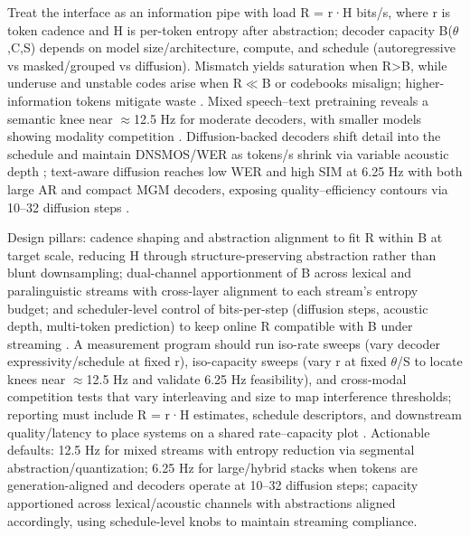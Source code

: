 \documentclass{article}
\begin{document}
Treat the interface as an information pipe with load R = r·H bits/s, where r is token cadence and H is per-token entropy after abstraction; decoder capacity B($\theta$,C,S) depends on model size/architecture, compute, and schedule (autoregressive vs masked/grouped vs diffusion). Mismatch yields saturation when R>B, while underuse and unstable codes arise when R$\ll$B or codebooks misalign; higher-information tokens mitigate waste \cite{huang2024repcodecspeechrepresentationcodectokeniz,chen2023reducingbarriersselfsupervisedlearninghu}. Mixed speech--text pretraining reveals a semantic knee near $\approx$12.5 Hz for moderate decoders, with smaller models showing modality competition \cite{zeng2024scalingspeechtextpretrainingsyntheticint}. Diffusion-backed decoders shift detail into the schedule and maintain DNSMOS/WER as tokens/s shrink via variable acoustic depth \cite{yang2025diffsoundstreamefficientspeechtokenizati}; text-aware diffusion reaches low WER and high SIM at 6.25 Hz with both large AR and compact MGM decoders, exposing quality--efficiency contours via 10--32 diffusion steps \cite{wang2025tadicodectextawarediffusionspeechtokeniz}.

Design pillars: cadence shaping and abstraction alignment to fit R within B at target scale, reducing H through structure-preserving abstraction rather than blunt downsampling; dual-channel apportionment of B across lexical and paralinguistic streams with cross-layer alignment to each stream's entropy budget; and scheduler-level control of bits-per-step (diffusion steps, acoustic depth, multi-token prediction) to keep online R compatible with B under streaming \cite{zeng2024scalingspeechtextpretrainingsyntheticint,yang2025diffsoundstreamefficientspeechtokenizati,wang2025tadicodectextawarediffusionspeechtokeniz}. A measurement program should run iso-rate sweeps (vary decoder expressivity/schedule at fixed r), iso-capacity sweeps (vary r at fixed $\theta$/S to locate knees near $\approx$12.5 Hz and validate 6.25 Hz feasibility), and cross-modal competition tests that vary interleaving and size to map interference thresholds; reporting must include R = r·H estimates, schedule descriptors, and downstream quality/latency to place systems on a shared rate--capacity plot \cite{zeng2024scalingspeechtextpretrainingsyntheticint,yang2025diffsoundstreamefficientspeechtokenizati,wang2025tadicodectextawarediffusionspeechtokeniz}. Actionable defaults: 12.5 Hz for mixed streams with entropy reduction via segmental abstraction/quantization; 6.25 Hz for large/hybrid stacks when tokens are generation-aligned and decoders operate at 10--32 diffusion steps; capacity apportioned across lexical/acoustic channels with abstractions aligned accordingly, using schedule-level knobs to maintain streaming compliance.
\end{document}
